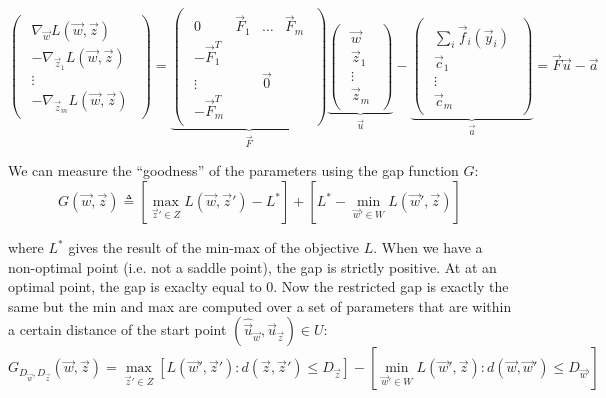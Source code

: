 \begin{equation}
  \begin{pmatrix}
    \begin{array}{c}
      \nabla_{\vec w} {L}(\vec w,\vec z)\\
      -\nabla_{\vec z_1} {L}(\vec w,\vec z)\\
      \vdots\\
      -\nabla_{\vec z_m} {L}(\vec w,\vec z)
    \end{array}
  \end{pmatrix} =
  \underbrace{
    \begin{pmatrix}
      \begin{array}{cccc}
        0 & \vec F_1 & \dots & \vec F_m\\
        -\vec F_1^T & & &\\
        \vdots & & \vec 0 &\\
        -\vec F_m^T & & &
      \end{array}
    \end{pmatrix}}_{\vec F}
  \underbrace{
    \begin{pmatrix}
      \begin{array}{c}
        \vec w\\
        \vec z_1\\
        \vdots\\
        \vec z_m
      \end{array}
    \end{pmatrix}}_{\vec u}-
  \underbrace{
    \begin{pmatrix}
      \begin{array}{c}
        \sum_i \vec f_i(\vec y_i)\\
        \vec c_1\\
        \vdots\\
        \vec c_m
      \end{array}
    \end{pmatrix}}_{\vec a} = \vec F \vec u - \vec a
\end{equation}

We can measure the ``goodness'' of the parameters using the gap function
${G}$:
\begin{equation}
  {G}(\vec w, \vec z) \triangleq \left[ \max_{\vec z' \in {Z}}
{L}(\vec w,\vec z') - {L}^* \right] + \left[ {L}^* -
\min_{\vec w' \in {W}} {L}(\vec w', \vec z) \right]
\end{equation}

where ${L}^*$ gives the result of the min-max of the objective
${L}$. When we have a non-optimal point (i.e. not a saddle point), the
gap is strictly positive. At at an optimal point, the gap is exaclty equal to 0.
Now the restricted gap is exactly the same but the min and max are computed over
a set of parameters that are within a certain distance of the start point
$(\hat{\vec u}_{\vec w},\hat{\vec u}_{\vec z}) \in {U}$:
\begin{equation}
  {G}_{D_{\vec w}, D_{\vec z}}(\vec w, \vec z) = \max_{\vec z' \in
{Z}} \left[ {L}(\vec w', \vec z') : d(\vec z, \vec z') \leq
D_{\vec z} \right] - \left [ \min_{\vec w' \in {W}} {L}(\vec w',
\vec z) : d(\vec w, \vec w') \leq D_{\vec w'} \right ]
\end{equation}

